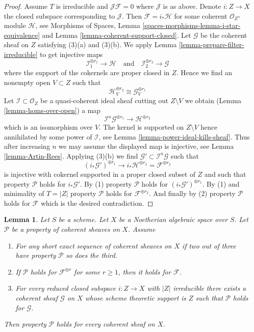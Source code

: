 \documentclass{stacks-project}
\theoremstyle{plain}
\newtheorem{lemma}[subsection]{Lemma}
\theoremstyle{definition}
\theoremstyle{remark}
\numberwithin{equation}{subsection}
\begin{document}
\begin{proof}
\medskip\noindent
Assume $T$ is irreducible and $\mathcal{J}\mathcal{F} = 0$ where
$\mathcal{J}$ is as above. Denote $i : Z \to X$ the closed subspace
corresponding to $\mathcal{J}$. Then $\mathcal{F} = i_*\mathcal{H}$
for some coherent $\mathcal{O}_Z$-module $\mathcal{H}$, see
Morphisms of Spaces, Lemma \ref{spaces-morphisms-lemma-i-star-equivalence}
and Lemma \ref{lemma-coherent-support-closed}.
Let $\mathcal{G}$ be the coherent sheaf on $Z$ satisfying
(3)(a) and (3)(b). We apply Lemma \ref{lemma-prepare-filter-irreducible}
to get injective maps
$$
\mathcal{I}_1^{\oplus r_1} \to \mathcal{H}
\quad\text{and}\quad
\mathcal{I}_2^{\oplus r_2} \to \mathcal{G}
$$
where the support of the cokernels are proper closed in $Z$. Hence we find
an nonempty open $V \subset Z$ such that
$$
\mathcal{H}^{\oplus r_2}_V \cong \mathcal{G}^{\oplus r_1}_V
$$
Let $\mathcal{I} \subset \mathcal{O}_Z$ be a quasi-coherent ideal sheaf
cutting out $Z \setminus V$ we obtain
(Lemma \ref{lemma-homs-over-open})
a map
$$
\mathcal{I}^n\mathcal{G}^{\oplus r_1} \longrightarrow \mathcal{H}^{\oplus r_2}
$$
which is an isomorphism over $V$. The kernel is supported on $Z \setminus V$
hence annihilated by some power of $\mathcal{I}$, see
Lemma \ref{lemma-power-ideal-kills-sheaf}. Thus after increasing
$n$ we may assume the displayed map is injective, see
Lemma \ref{lemma-Artin-Rees}. Applying (3)(b) we find
$\mathcal{G}' \subset \mathcal{I}^n\mathcal{G}$ such that
$$
(i_*\mathcal{G}')^{\oplus r_1} \longrightarrow
i_*\mathcal{H}^{\oplus r_2} = \mathcal{F}^{\oplus r_2}
$$
is injective with cokernel supported in a proper closed subset of $Z$
and such that property $\mathcal{P}$ holds for $i_*\mathcal{G}'$.
By (1) property $\mathcal{P}$ holds for $(i_*\mathcal{G}')^{\oplus r_1}$.
By (1) and minimality of $T = |Z|$ property $\mathcal{P}$ holds for
$\mathcal{F}^{\oplus r_2}$. And finally by (2) property $\mathcal{P}$
holds for $\mathcal{F}$ which is the desired contradiction.
\end{proof}

\begin{lemma}
\label{lemma-property-higher-rank-cohomological-variant}
Let $S$ be a scheme. Let $X$ be a Noetherian algebraic space over $S$.
Let $\mathcal{P}$ be a property of coherent sheaves on $X$. Assume
\begin{enumerate}
\item For any short exact sequence of coherent sheaves on $X$
if two out of three have property $\mathcal{P}$ so does the third.
\item If $\mathcal{P}$ holds  for $\mathcal{F}^{\oplus r}$ for
some $r \geq 1$, then it holds for $\mathcal{F}$.
\item For every reduced closed subspace $i : Z \to X$ with
$|Z|$ irreducible there exists a coherent sheaf $\mathcal{G}$ on $X$
whose scheme theoretic support is $Z$ such that $\mathcal{P}$ holds for
$\mathcal{G}$.
\end{enumerate}
Then property $\mathcal{P}$ holds for every coherent sheaf on $X$.
\end{lemma}
\end{document}
